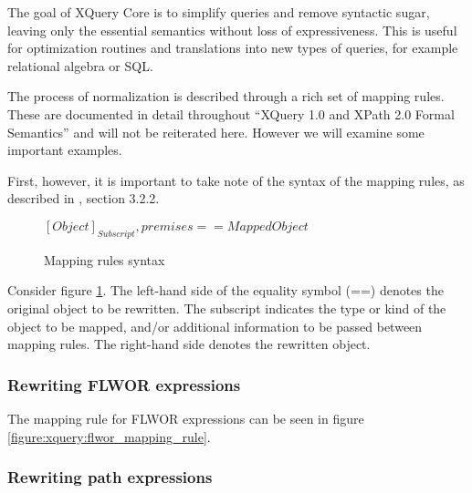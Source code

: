 The goal of XQuery Core is to simplify queries and remove syntactic sugar,
leaving only the essential semantics without loss of expressiveness.
This is useful for optimization routines and translations into new types of
queries, for example relational algebra or SQL.

The process of normalization is described through a rich set of mapping
rules. These are documented in detail throughout ``XQuery 1.0 and XPath 2.0
Formal Semantics''\cite{xquery_semantics} and will not be reiterated here.
However we will examine some important examples.

First, however, it is important to take note of the syntax of the mapping
rules, as described in \cite{xquery_semantics}, section 3.2.2. 
 
\begin{figure}[!h]
  \centering
$
[Object]_{Subscript}, premises == Mapped Object
$
  \caption{Mapping rules syntax}
  \label{figure:xquery:mapping_rules}
\end{figure}

Consider figure \ref{figure:xquery:mapping_rules}. The left-hand side of the
equality symbol (==) denotes the original object to be rewritten. The
subscript indicates the type or kind of the object to be mapped, and/or
additional information to be passed between mapping rules. The right-hand side
denotes the rewritten object.

\subsubsection{Rewriting FLWOR expressions}
The mapping rule for FLWOR expressions can be seen in figure
\ref{figure:xquery:flwor_mapping_rule}.

%

\subsubsection{Rewriting path expressions}

